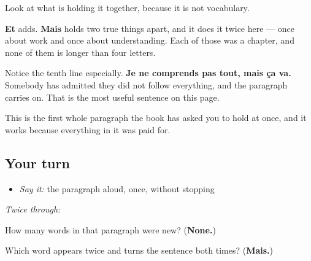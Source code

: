 \begin{culture}
Look at what is holding it together, because it is not vocabulary.

\textbf{Et} adds. \textbf{Mais} holds two true things apart, and it does it twice here — once about work and once about understanding. Each of those was a chapter, and none of them is longer than four letters.

Notice the tenth line especially. \textbf{Je ne comprends pas tout, mais ça va.} Somebody has admitted they did not follow everything, and the paragraph carries on. That is the most useful sentence on this page.

This is the first whole paragraph the book has asked you to hold at once, and it works because everything in it was paid for.
\end{culture}

\subsection*{Your turn}
\begin{itemize}
\raggedright
  \item \emph{Say it:} the paragraph aloud, once, without stopping
\end{itemize}

\emph{Twice through:}

\begin{tcolorbox}[breakable,colback=teal!4,colframe=teal!35!black,title={Before you move on}]
How many words in that paragraph were new? (\textbf{None.})

Which word appears twice and turns the sentence both times? (\textbf{Mais.})
\end{tcolorbox}
